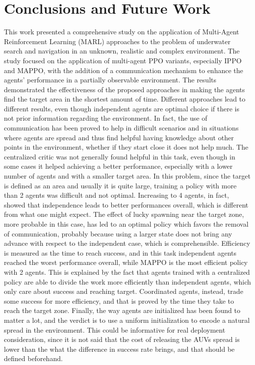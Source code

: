 \chapter{Conclusions and Future Work}

This work presented a comprehensive study on the application of Multi-Agent Reinforcement Learning (MARL)
approaches to the problem of underwater search and navigation in an unknown, realistic and complex environment.
The study focused on the application of multi-agent PPO variants, especially IPPO and MAPPO, with the addition of a 
communication mechanism to enhance the agents' performance in a partially observable environment. The results demonstrated
the effectiveness of the proposed approaches in making the agents find the target area in the shortest amount of time. 
Different approaches lead to different results, even though independent agents are optimal choice if there is not prior 
information regarding the environment. In fact, the use of communication has been proved to help in difficult scenarios and
in situations where agents are spread and thus find helpful having knowledge about other points in the environment,
whether if they start close it does not help much. The centralized critic was not generally found helpful in this task,
even though in some cases it helped achieving a better performance, especially with a lower number of agents and with a 
smaller target area. 
In this problem, since the target is defined as an area and usually it is quite large, training a policy with more than 2 agents
was difficult and not optimal. Increasing to 4 agents, in fact, showed that independence leads to better performances overall, which is 
different from what one might expect. The effect of lucky spawning near the target zone, more probable in this case,
has led to an optimal policy which favors the removal of communication, probably because using a larger state does not bring 
any advance with respect to the independent case, which is comprehensible.
Efficiency is measured as the time to reach success, and in this task independent agents reached the worst performance overall, 
while MAPPO is the most efficient policy with 2 agents. This is explained by the fact that agents trained with a centralized policy
are able to divide the work more efficiently than independent agents, which only care about success and reaching target. Coordinated agents,
instead, trade some success for more efficiency, and that is proved by the time they take to reach the target zone. 
Finally, the way agents are initialized has been found to matter a lot,
and the verdict is to use a uniform initialization to encode a natural spread in the environment. This could be informative for 
real deployment consideration, since it is not said that the cost of releasing the AUVs spread is lower than the what the difference in 
success rate brings, and that should be defined beforehand.

